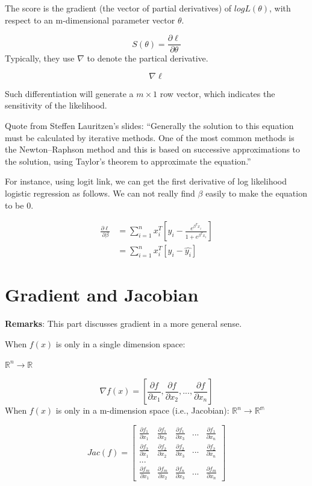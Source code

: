 \documentclass[]{book}
\begin{document}
The score is the gradient (the vector of partial derivatives) of
\(log L(\theta)\), with respect to an m-dimensional parameter vector
\(\theta\).

\[S(\theta) = \frac{\partial\ell}{\partial \theta}\] Typically, they use
\(\nabla\) to denote the partical derivative.

\[\nabla \ell\]

Such differentiation will generate a \(m \times 1\) row vector, which
indicates the sensitivity of the likelihood.

Quote from Steffen Lauritzen's slides: ``Generally the solution to this
equation must be calculated by iterative methods. One of the most common
methods is the Newton--Raphson method and this is based on successive
approximations to the solution, using Taylor's theorem to approximate
the equation.''

For instance, using logit link, we can get the first derivative of log
likelihood logistic regression as follows. We can not really find
\(\beta\) easily to make the equation to be 0.

\[\begin{aligned}
\frac{\partial \ell} {\partial \beta} 
&= \sum_{i=1}^{n}x_i^T[y_i-\frac{e^{\beta^Tx_i}}{1+e^{\beta^Tx_i}}] \\
&=\sum_{i=1}^{n} x_i^T[y_i-\hat{y_i}]
\end{aligned}\]

\section{Gradient and Jacobian}\label{gradient-and-jacobian}

\textbf{Remarks}: This part discusses gradient in a more general sense.

When \(f(x)\) is only in a single dimension space:

\(\mathbb{R}^n \rightarrow \mathbb{R}\)

\[\nabla f(x)=[\frac{\partial f}{\partial x_1},\frac{\partial f}{\partial x_2},...,\frac{\partial f}{\partial x_n}]\]
When \(f(x)\) is only in a m-dimension space (i.e., Jacobian):
\(\mathbb{R}^n \rightarrow \mathbb{R^m}\)

\[Jac(f)=\begin{bmatrix}
\frac{\partial f_1}{\partial x_1} & \frac{\partial f_1}{\partial x_2} & \frac{\partial f_1}{\partial x_3} & ... & \frac{\partial f_1}{\partial x_n}\\
\frac{\partial f_2}{\partial x_1} & \frac{\partial f_2}{\partial x_2} & \frac{\partial f_2}{\partial x_3} & ... & \frac{\partial f_2}{\partial x_n} \\
...\\
\frac{\partial f_m}{\partial x_1} & \frac{\partial f_m}{\partial x_2} & \frac{\partial f_n}{\partial x_3} & ... & \frac{\partial f_m}{\partial x_n}
\end{bmatrix}\]
\end{document}
